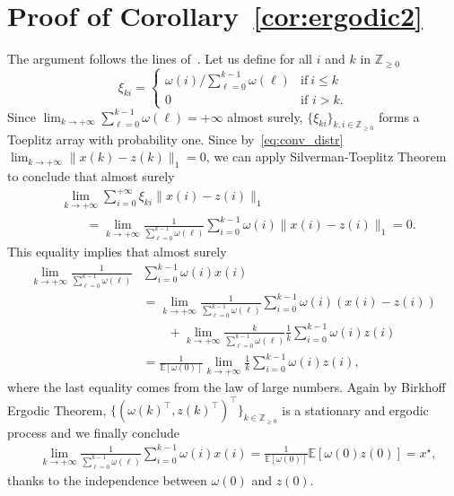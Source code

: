 \documentclass{IEEEtran}
\newcommand{\integernonnegative}{\mathbb{Z}_{\ge 0}}
\def\Exp{\mathbb{E}}
\newcommand{\1}{\mathbf{1}} \newcommand{\ind}{\mathds{1}}
\begin{document}
\section{Proof of Corollary~\ref{cor:ergodic2}}\label{sec:proofB}
The argument follows the lines of~\cite[Theorem 4.1]{KY-SS-LQ:14}.
Let us define for all $i$ and $k$ in $\integernonnegative$
$$\xi_{ki}=\begin{cases}\omega(i)/\sum_{\ell=0}^{k-1}\omega(\ell)&\text{if}\ i\leq k\\
0&\text{if }i>k.\end{cases}$$
Since $\lim_{k\rightarrow+\infty}\sum_{\ell=0}^{k-1}\omega(\ell)=+\infty$ almost surely, $\{\xi_{ki}\}_{k,i\in\integernonnegative}$ forms a Toeplitz array with probability one.
Since by~\eqref{eq:conv_distr} $\lim_{k\rightarrow+\infty}\|x(k)-z(k)\|_1=0$, we can apply Silverman-Toeplitz Theorem~\cite{OT:11} to conclude that almost surely 
\begin{align*}
&\lim_{k\rightarrow+\infty}\sum_{i=0}^{+\infty}\xi_{ki}\|x(i)-z(i)\|_1\\
&\qquad=\lim_{k\rightarrow+\infty}\frac{1}{\sum_{\ell=0}^{k-1}\omega(\ell)}\sum_{i=0}^{k-1}\omega(i)\|x(i)-z(i)\|_1=0. 
\end{align*}
This equality implies that almost surely
\begin{align*}
\lim_{k\rightarrow+\infty}\frac{1}{\sum_{\ell=0}^{k-1}\omega(\ell)}&\sum_{i=0}^{k-1}\omega(i) x(i)\\
&=
\lim_{k\rightarrow+\infty}\frac{1}{\sum_{\ell=0}^{k-1}\omega(\ell)}\sum_{i=0}^{k-1}\omega(i) (x(i)-z(i))\\
&\qquad+\lim_{k\rightarrow+\infty}\frac{k}{\sum_{\ell=0}^{k-1}\omega(\ell)}\frac{1}{k}\sum_{i=0}^{k-1}\omega(i) z(i)\\
& = \frac{1}{\Exp[\omega(0)]} \lim_{k\rightarrow+\infty} \frac{1}{k}\sum_{i=0}^{k-1} \omega(i) z(i),
\end{align*}
where the last equality comes from the law of large numbers. 
Again by Birkhoff Ergodic Theorem, $\{(\omega(k)^{\top},z(k)^{\top})^{\top}\}_{k\in\integernonnegative}$ is a stationary and ergodic process and we finally conclude
\begin{align*}
&\lim_{k\rightarrow+\infty}\frac{1}{\sum_{\ell=0}^{k-1}\omega(\ell)}\sum_{i=0}^{k-1}\omega(i) x(i)=\frac{1}{\Exp[\omega(0)]}\Exp{[\omega(0)z(0)]}
=x^{\star},
\end{align*}
thanks to the independence between $\omega(0)$ and $z(0)$.



\end{document}
